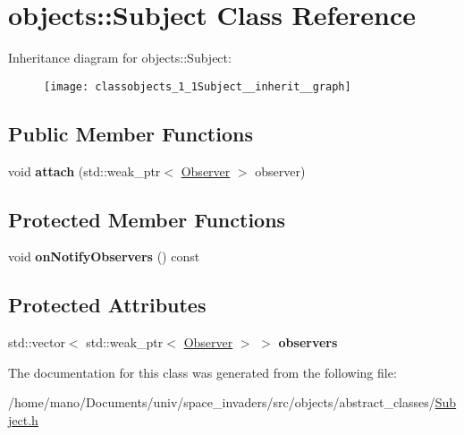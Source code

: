 \hypertarget{classobjects_1_1Subject}{}\section{objects\+:\+:Subject Class Reference}
\label{classobjects_1_1Subject}


Inheritance diagram for objects\+:\+:Subject\+:\nopagebreak
\begin{figure}[H]
\begin{center}
\leavevmode
\texttt{[image: classobjects\_1\_1Subject\_\_inherit\_\_graph]}
\end{center}
\end{figure}
\subsection*{Public Member Functions}
\begin{DoxyCompactItemize}
\item 
\mbox{\label{classobjects_1_1Subject_a17c678c4c3c50a76fd972952a7e7ca75}}
void {\bfseries attach} (std\+::weak\+\_\+ptr$<$ \hyperlink{classobjects_1_1Observer}{Observer} $>$ observer)
\end{DoxyCompactItemize}
\subsection*{Protected Member Functions}
\begin{DoxyCompactItemize}
\item 
\mbox{\label{classobjects_1_1Subject_a2562dcbae6bbb26ce21cec268fe5ed41}}
void {\bfseries on\+Notify\+Observers} () const
\end{DoxyCompactItemize}
\subsection*{Protected Attributes}
\begin{DoxyCompactItemize}
\item 
\mbox{\label{classobjects_1_1Subject_a3764a6f9d547038483f139cc72061c44}}
std\+::vector$<$ std\+::weak\+\_\+ptr$<$ \hyperlink{classobjects_1_1Observer}{Observer} $>$ $>$ {\bfseries observers}
\end{DoxyCompactItemize}


The documentation for this class was generated from the following file\+:\begin{DoxyCompactItemize}
\item 
/home/mano/\+Documents/univ/space\+\_\+invaders/src/objects/abstract\+\_\+classes/\hyperlink{Subject_8h}{Subject.\+h}\end{DoxyCompactItemize}
